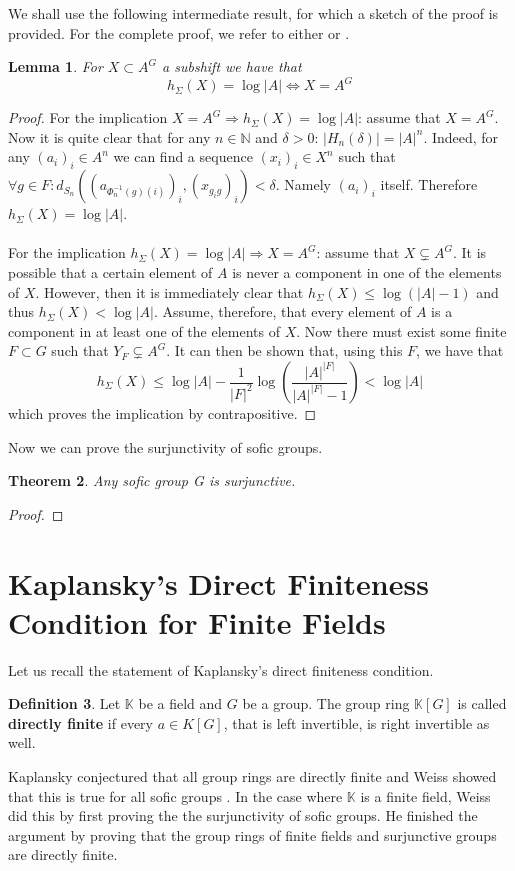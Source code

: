 \documentclass[titlepage, a4paper]{article}
\newcommand{\N}{\mathbb{N}}
\newtheorem{theorem}{Theorem}[section]
\newtheorem{lemma}[theorem]{Lemma}
\theoremstyle{definition}
\newtheorem{definition}[theorem]{Definition}
\theoremstyle{remark}
\begin{document}
We shall use the following intermediate result, for which a sketch of the proof is provided. For the complete proof, we refer to either \cite[paragraph 2.13.7]{capraro_lupini_2015} or \cite[theorem 4.12]{kerr_li_2010}.

\begin{lemma}
For $X \subset A^G$ a subshift we have that 
		\[
		h_\Sigma(X) = \log |A| \Leftrightarrow X = A^G
		\]
\end{lemma}
\begin{proof}
For the implication $X = A^G \Rightarrow h_\Sigma(X) = \log |A|$: assume that $X = A^G$. Now it is quite clear that for any $n \in \N$ and $\delta > 0$: $|H_n(\delta)| = |A|^n$. Indeed, for any $(a_i)_i \in A^n$ we can find a sequence $(x_i)_i \in X^n$ such that $\forall g \in F: d_{S_n}((a_{\Phi^{-1}_n(g)(i)})_i,(x_{g_i g})_i) < \delta$. Namely  $(a_i)_i$ itself. Therefore $h_\Sigma(X) = \log |A|$.\\
\\
For the implication $h_\Sigma(X) = \log |A| \Rightarrow X = A^G$: assume that $X \varsubsetneq A^G$. It is possible that a certain element of $A$ is never a component in one of the elements of $X$. However, then it is immediately clear that $h_\Sigma(X) \leq \log (|A|-1) $ and thus $h_\Sigma(X) < \log |A|$. Assume, therefore, that every element of $A$ is a component in at least one of the elements of $X$. Now there must exist some finite $F \subset G$ such that $Y_F \varsubsetneq A^G$. It can then be shown that, using this $F$, we have that
		\[
		h_\Sigma(X) \leq \log |A| - \frac{1}{|F|^2} \log \left(\frac{|A|^{|F|}}{|A|^{|F|} - 1}\right) < \log |A|
		\]
which proves the implication by contrapositive. 
\end{proof}

Now we can prove the surjunctivity of sofic groups.

\begin{theorem}
Any sofic group G is surjunctive.
\end{theorem}
\begin{proof}

\end{proof}

	\section{Kaplansky's Direct Finiteness Condition for Finite Fields}
	Let us recall the statement of Kaplansky's direct finiteness condition.
	\begin{definition}
		Let $\mathbb K$ be a field and $G$ be a group. The group ring $\mathbb K[G]$ is called \textbf{directly finite} if every  $a \in K[G]$, that is left invertible, is right invertible as well. 
		
	\end{definition}
	Kaplansky conjectured that all group rings are directly finite and Weiss showed that this is true for all sofic groups \cite[section 3, section 4]{weiss_2000}. 
	In the case where $\mathbb K$ is a finite field, Weiss did this by first proving the the surjunctivity of sofic groups.
	He finished the argument by proving that the group rings of finite fields and surjunctive groups are directly finite.  
\end{document}
